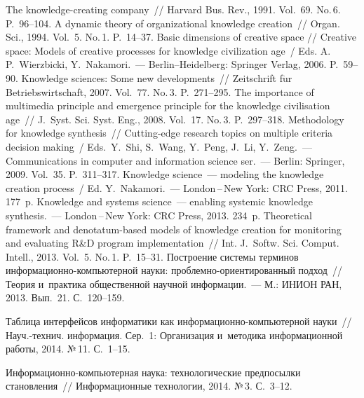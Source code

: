 {\begin{multicols}{2}
{\small\frenchspacing
 {%
 \begin{thebibliography}{99}
 The knowledge-creating company~// Harvard Bus. Rev., 1991. 
Vol.~69. No.\,6. P.~96--104.
 A dynamic theory of organizational knowledge creation~// Organ. 
Sci., 1994. Vol.~5. No.\,1. P.~14--37.
 Basic dimensions of creative space // Creative space: 
Models of creative processes for knowledge civilization age~/ Eds. A.\,P.~Wierzbicki, 
Y.~Nakamori.~--- Berlin--Heidelberg: Springer Verlag, 2006. P.~59--90.
 Knowledge sciences: Some new developments~// 
Zeitschrift f$\ddot{\mbox{u}}$r Betriebswirtschaft, 2007. Vol.~77. No.\,3. P.~271--295.
 The importance of multimedia principle and emergence 
principle for the knowledge civilisation age~// J.~Syst. Sci. Syst. Eng., 2008. 
Vol.~17. No.\,3. P.~297--318.
 Methodology for knowledge synthesis~// 
Cutting-edge research topics on  multiple criteria decision making~/ 
Eds.\ Y.~Shi, S.~Wang, Y.~Peng, J.~Li, Y.~Zeng.~---
Communications in computer and information science ser.~--- 
Berlin: Springer, 2009. Vol.~35. P.~311--317.
Knowledge science~--- modeling the knowledge creation process~/
Ed. Y.~Nakamori.~--- London\,--\,New York: CRC Press, 2011. 
177~p.
 Knowledge and systems science~--- enabling systemic knowledge 
synthesis.~--- London\,--\,New York: CRC Press, 2013. 234~p.
 Theoretical framework and denotatum-based models of 
knowledge creation for monitoring and evaluating R\&D program implementation~// 
Int. J.~Softw. Sci. Comput. Intell., 2013. Vol.~5. No.\,1. 
P.~15--31.
 Построение системы терминов 
ин\-фор\-ма\-ци\-он\-но-компью\-тер\-ной науки: 
проб\-лем\-но-ори\-ен\-ти\-ро\-ван\-ный подход~// Теория и~практика общественной 
научной информации.~--- М.: \mbox{ИНИОН} РАН, 2013. Вып.~21. С.~120--159.

 Таблица интерфейсов информатики как  
ин\-фор\-ма\-ци\-он\-но-компью\-тер\-ной науки~// 
На\-уч.-тех\-нич. информация. Сер.~1: Организация и~методика информационной 
работы, 2014. №\,11. С.~1--15.

 Ин\-фор\-ма\-ци\-он\-но-компью\-тер\-ная наука: технологические 
предпосылки становления~// Информационные технологии, 2014. №\,3. С.~3--12.


\end{thebibliography}}}
\end{multicols}}
